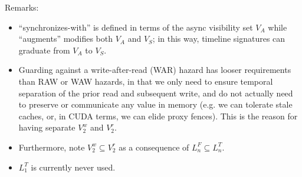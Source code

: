Remarks:
\begin{itemize}
  \item ``synchronizes-with'' is defined in terms of the async visibility set $V_A$ while ``augments'' modifies both $V_A$ and $V_S$; in this way, timeline signatures can graduate from $V_A$ to $V_S$.
  \item Guarding against a write-after-read (WAR) hazard has looser requirements than RAW or WAW hazards, in that we only need to ensure temporal separation of the prior read and subsequent write, and do not actually need to preserve or communicate any value in memory (e.g. we can tolerate stale caches, or, in CUDA terms, we can elide proxy fences).
  This is the reason for having separate $V_2^w$ and $V_2^r$.
  \item Furthermore, note $V_2^w \subseteq V_2^r$ as a consequence of $L_n^F \subseteq L_n^T$.
  \item $L_1^T$ is currently never used.
\end{itemize}


